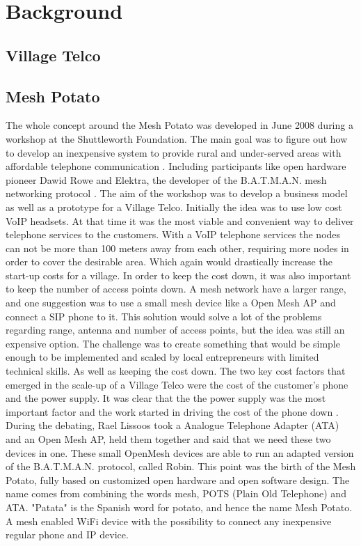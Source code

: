 \chapter{Background}
\label{chp:background} 

\section{Village Telco}

\section{Mesh Potato}



The whole concept around the Mesh Potato was developed in June 2008 during a workshop at the Shuttleworth Foundation. The main goal was to figure out how to develop an inexpensive system to provide rural and under-served areas with affordable telephone communication \cite{MParticle}. Including participants like open hardware pioneer Dawid Rowe and Elektra, the developer of the B.A.T.M.A.N. mesh networking protocol \cite{MPworkshop}. The aim of the workshop was to develop a business model as well as a prototype for a Village Telco. Initially the idea was to use low cost VoIP headsets. At that time it was the most viable and convenient way to deliver telephone services to the customers. With a VoIP telephone services the nodes can not be more than 100 meters away from each other, requiring more nodes in order to cover the desirable area. Which again would drastically increase the start-up costs for a village. In order to keep the cost down, it was also important to keep the number of access points down. A mesh network have a larger range, and one suggestion was to use a small mesh device like a Open Mesh AP and connect a SIP phone to it. This solution would solve a lot of the problems regarding range, antenna and number of access points, but the idea was still an expensive option. The challenge was to create something that would be simple enough to be implemented and scaled by local entrepreneurs with limited technical skills. As well as keeping the cost down. The two key cost factors that emerged in the scale-up of a Village Telco were the cost of the customer's phone and the power supply. It was clear that the the power supply was the most important factor and the work started in driving the cost of the phone down \cite{MPworkshop}. During the debating, Rael Lissoos took a Analogue Telephone Adapter (ATA) and an Open Mesh AP, held them together and said that we need these two devices in one. These small OpenMesh devices are able to run an adapted version of the B.A.T.M.A.N. protocol, called Robin. This point was the birth of the Mesh Potato, fully based on customized open hardware and open software design. The name comes from combining the words mesh, POTS (Plain Old Telephone) and ATA. "Patata" is the Spanish word for potato, and hence the name Mesh Potato. A mesh enabled WiFi device with the possibility to connect any inexpensive regular phone and IP device. \cite{MPorigin}

